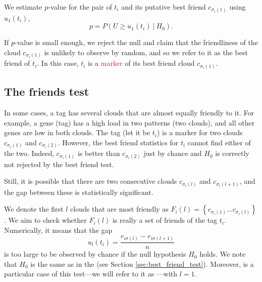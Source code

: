 \documentclass{llncs}
\begin{document}
We estimate $p$-value for the pair of $t_i$ and its putative best friend $c_{\sigma_{i}(1)}$ using $u_1(t_i)$,
\[
p = P\left(U \ge u_1(t_i)~|~H_0\right). 
\]

If $p$-value is small enough, we reject the null and claim that the friendliness of the cloud $c_{\sigma_{i}(1)}$ is unlikely to observe by random, and so we refer to it as the best friend of $t_i$. In this case, $t_i$ is a \textcolor{red}{marker} of its best friend cloud $c_{\sigma_{i}(1)}$.

\subsection{The friends test}
\label{sec:friends_test}

In some cases, a tag has several clouds that are almost equally friendly to it. 
For example, a gene (tag) has a high load in two patterns (two clouds), and all other genes are low in both clouds. The tag (let it be $t_i$) is a marker for two clouds $c_{\sigma_{i}(1)}$ and $c_{\sigma_{i}(2)}$. However, the best friend statistics for $t_i$ cannot find either of the two. 
Indeed, $c_{\sigma_{i}(1)}$ is better than $c_{\sigma_{i}(2)}$ just by chance and $H_0$ is correctly not rejected by the best friend test.

Still, it is possible that there are two consecutive clouds $c_{\sigma_i(l)}$ and $c_{\sigma_i(l+1)}$, and the gap between these is statistically significant.

We denote the first $l$ clouds that are most friendly as $F_{i}(l) = \left\{ c_{\sigma_i(1)} \dots c_{\sigma_i(l)} \right\}$.
We aim to check whether $F_{i}(l)$ is really a set of friends of the tag $t_i$. Numerically, it means that the gap 
\[
u_{l}(t_i) = \frac{r_{i\sigma(l)} - r_{i\sigma(l+1)}}{n}
\]
is too large to be observed by chance if the null hypothesis $H_0$ holds. We note that $H_0$ is the same as in the  (see Section \ref{sec:best_friend_test}).
Moreover,  is a particular case of
this test---we will refer to it as ---with $l = 1$.


 

\end{document}
